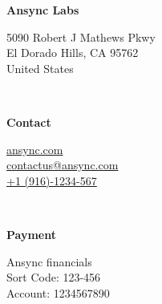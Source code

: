 \begin{minipage}[t]{0.3\textwidth}
	\itshape %
	
	\textbf{Ansync Labs} %
	
	5090 Robert J Mathews Pkwy \\ %
	El Dorado Hills, CA 95762 \\
	United States \\
\end{minipage}
\begin{minipage}[t]{0.03\textwidth}
	~ %
\end{minipage}
\begin{minipage}[t]{0.3\textwidth}
	\itshape %
	
	\textbf{Contact} %
	
	\href{https://ansync.com}{ansync.com} \\ %
	\href{mailto:contactus@ansync.com}{contactus@ansync.com} \\ %
	\href{+1(916)-1234-567}{+1 (916)-1234-567}\\ %
\end{minipage}
\begin{minipage}[t]{0.03\textwidth}
	~ %
\end{minipage}
\begin{minipage}[t]{0.3\textwidth}
	\itshape %
	
	\textbf{Payment} %
	
	Ansync financials \\ %
	Sort Code: 123-456 \\
	Account: 1234567890 \\
\end{minipage}



